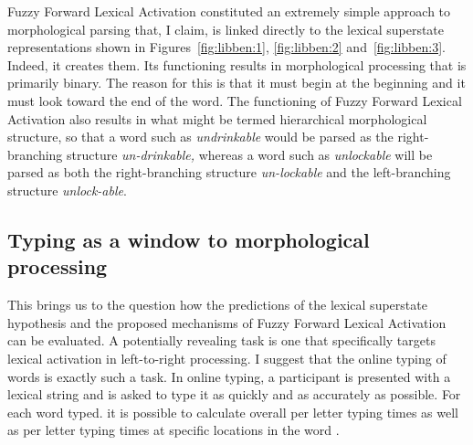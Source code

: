 \documentclass[output=paper]{langsci/langscibook}
\begin{document}

Fuzzy Forward Lexical Activation constituted an extremely simple approach to morphological parsing that, I claim, is linked directly to the lexical superstate representations shown in Figures~\ref{fig:libben:1}, \ref{fig:libben:2} and~\ref{fig:libben:3}. Indeed, it creates them.  Its functioning results in morphological processing that is primarily binary. The reason for this is that it must begin at the beginning and it must look toward the end of the word. The functioning of Fuzzy Forward Lexical Activation also results in what might be termed hierarchical morphological structure, so that a word such as \textit{undrinkable} would be parsed as the right-branching structure \textit{un-drinkable,} whereas a word such as \textit{unlockable} will be parsed as both the right-branching structure \textit{un-lockable} and the left-branching structure \textit{unlock-able}.

\subsection{Typing as a window to morphological processing}\label{sec:libben:1.5}

This brings us to the question how the predictions of the lexical superstate hypothesis and the proposed mechanisms of Fuzzy Forward Lexical Activation can be evaluated.  A potentially revealing task is one that specifically targets lexical activation in left-to-right processing.  I suggest that the online typing of words is exactly such a task.  In online typing, a participant is presented with a lexical string and is asked to type it as quickly and as accurately as possible.  For each word typed. it is possible to calculate overall per letter typing times as well as per letter typing times at specific locations in the word \citep{FeldmanEtAl2019,LibbenJaremaEtAl2016,SahelWeingarten2008,WillWeingarten2006}.
\end{document}
